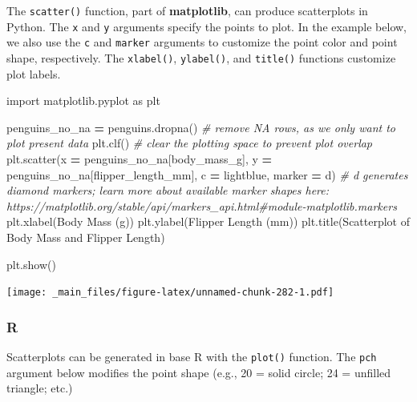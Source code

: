 \documentclass[
]{book}
\newenvironment{Shaded}{\begin{snugshade}}{\end{snugshade}}
\newcommand{\CommentTok}[1]{\textcolor[rgb]{0.56,0.35,0.01}{\textit{#1}}}
\newcommand{\ImportTok}[1]{#1}
\newcommand{\NormalTok}[1]{#1}
\newcommand{\OperatorTok}[1]{\textcolor[rgb]{0.81,0.36,0.00}{\textbf{#1}}}
\newcommand{\StringTok}[1]{\textcolor[rgb]{0.31,0.60,0.02}{#1}}
\begin{document}
The \texttt{scatter()} function, part of \textbf{matplotlib}, can produce scatterplots in Python. The \texttt{x} and \texttt{y} arguments specify the points to plot. In the example below, we also use the \texttt{c} and \texttt{marker} arguments to customize the point color and point shape, respectively. The \texttt{xlabel()}, \texttt{ylabel()}, and \texttt{title()} functions customize plot labels.

\begin{Shaded}
\begin{Highlighting}[]
\ImportTok{import}\NormalTok{ matplotlib.pyplot }\ImportTok{as}\NormalTok{ plt}

\NormalTok{penguins\_no\_na }\OperatorTok{=}\NormalTok{ penguins.dropna() }\CommentTok{\# remove NA rows, as we only want to plot present data}
\NormalTok{plt.clf() }\CommentTok{\# clear the plotting space to prevent plot overlap}
\NormalTok{plt.scatter(x }\OperatorTok{=}\NormalTok{ penguins\_no\_na[}\StringTok{\textquotesingle{}body\_mass\_g\textquotesingle{}}\NormalTok{], y }\OperatorTok{=}\NormalTok{ penguins\_no\_na[}\StringTok{\textquotesingle{}flipper\_length\_mm\textquotesingle{}}\NormalTok{], c }\OperatorTok{=} \StringTok{\textquotesingle{}lightblue\textquotesingle{}}\NormalTok{, marker }\OperatorTok{=} \StringTok{\textquotesingle{}d\textquotesingle{}}\NormalTok{) }\CommentTok{\# \textquotesingle{}d\textquotesingle{} generates diamond markers; learn more about available marker shapes here: https://matplotlib.org/stable/api/markers\_api.html\#module{-}matplotlib.markers}
\NormalTok{plt.xlabel(}\StringTok{\textquotesingle{}Body Mass (g)\textquotesingle{}}\NormalTok{)}
\NormalTok{plt.ylabel(}\StringTok{\textquotesingle{}Flipper Length (mm)\textquotesingle{}}\NormalTok{)}
\NormalTok{plt.title(}\StringTok{\textquotesingle{}Scatterplot of Body Mass and Flipper Length\textquotesingle{}}\NormalTok{)}

\NormalTok{plt.show()}
\end{Highlighting}
\end{Shaded}

\texttt{[image: \_main\_files/figure-latex/unnamed-chunk-282-1.pdf]}

\hypertarget{r-43}{%
\subsubsection*{R}\label{r-43}}

Scatterplots can be generated in base R with the \texttt{plot()} function. The \texttt{pch} argument below modifies the point shape (e.g., 20 = solid circle; 24 = unfilled triangle; etc.)
\end{document}
